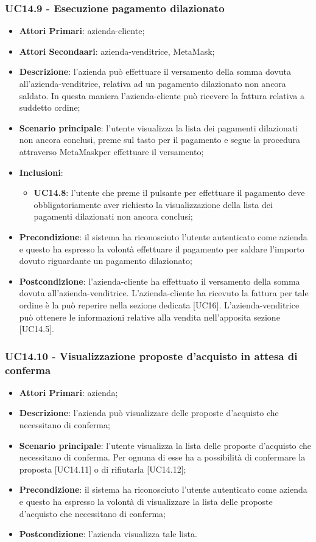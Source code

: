 \subsubsection{UC14.9 - Esecuzione pagamento dilazionato}
\begin{itemize}
	\item \textbf{Attori Primari}: azienda-cliente;
	\item \textbf{Attori Secondaari}: azienda-venditrice, MetaMask\glo;
	\item \textbf{Descrizione}: l'azienda può effettuare il versamento della somma dovuta all'azienda-venditrice, relativa ad un pagamento dilazionato non ancora saldato. In questa maniera l'azienda-cliente può ricevere la fattura relativa a suddetto ordine;
	\item \textbf{Scenario principale}: l'utente visualizza la lista dei pagamenti dilazionati non ancora conclusi, preme sul tasto per il pagamento e segue la procedura attraverso MetaMask\glosp per effettuare il versamento;
	\item \textbf{Inclusioni}: 
	\begin{itemize}
		\item \textbf{UC14.8}: l'utente che preme il pulsante per effettuare il pagamento deve obbligatoriamente aver richiesto la visualizzazione della lista dei pagamenti dilazionati non ancora conclusi;
	\end{itemize}
	\item \textbf{Precondizione}: il sistema ha riconosciuto l'utente autenticato come azienda e questo ha espresso la volontà effettuare il pagamento per saldare l'importo dovuto riguardante un pagamento dilazionato;
	\item \textbf{Postcondizione}: l'azienda-cliente ha effettuato il versamento della somma dovuta all'azienda-venditrice. L'azienda-cliente ha ricevuto la fattura per tale ordine è la può reperire nella sezione dedicata [UC16]. L'azienda-venditrice può ottenere le informazioni relative alla vendita nell'apposita sezione [UC14.5].
\end{itemize}
\subsubsection{UC14.10 - Visualizzazione proposte d'acquisto in attesa di conferma}
\begin{itemize}
	\item \textbf{Attori Primari}: azienda;
	\item \textbf{Descrizione}: l'azienda può visualizzare delle proposte d'acquisto che necessitano di conferma;
	\item \textbf{Scenario principale}: l'utente visualizza la lista delle proposte d'acquisto che necessitano di conferma. Per ognuna di esse ha a possibilità di confermare la proposta [UC14.11] o di rifiutarla [UC14.12];
	\item \textbf{Precondizione}: il sistema ha riconosciuto l'utente autenticato come azienda e questo ha espresso la volontà di visualizzare la lista delle proposte d'acquisto che necessitano di conferma;
	\item \textbf{Postcondizione}: l'azienda visualizza tale lista.
\end{itemize}
